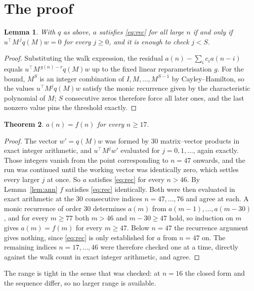 \documentclass[11pt,a4paper]{article}
\theoremstyle{plain}
\newtheorem{theorem}{Theorem}
\newtheorem{lemma}[theorem]{Lemma}
\theoremstyle{definition}
\begin{document}
\section{The proof}

\begin{lemma}\label{lem:crit}
With $q$ as above, $a$ satisfies \eqref{eq:rec} for all large $n$ if and only if
$u^{\!\top}M^{\,j}q(M)w=0$ for every $j\ge0$, and it is enough to check $j<S$.
\end{lemma}

\begin{proof}
Substituting the walk expression, the residual $a(n)-\sum_ic_ia(n-i)$ equals
$u^{\!\top}M^{\,g(n)-r}q(M)w$ up to the fixed linear reparametrisation $g$. For the bound,
$M^{S}$ is an integer combination of $I,M,\dots,M^{S-1}$ by Cayley--Hamilton, so the values
$u^{\!\top}M^{j}q(M)w$ satisfy the monic recurrence given by the characteristic polynomial of
$M$; $S$ consecutive zeros therefore force all later ones, and the last nonzero value pins the
threshold exactly.
\end{proof}

\begin{theorem}
$a(n)=f(n)$ for every $n\ge17$.
\end{theorem}

\begin{proof}
The vector $w'=q(M)w$ was formed by $30$ matrix--vector products in exact integer
arithmetic, and $u^{\!\top}M^{j}w'$ evaluated for $j=0,1,\dots$, again exactly. Those integers
vanish from the point corresponding to $n=47$ onwards, and the run was continued until the
working vector was identically zero, which settles every larger $j$ at once. So $a$ satisfies
\eqref{eq:rec} for every $n>46$. By Lemma~\ref{lem:ann} $f$ satisfies \eqref{eq:rec}
identically. Both were then evaluated in exact arithmetic at the $30$ consecutive indices
$n=47,\dots,76$ and agree at each. A monic recurrence of order $30$
determines $a(m)$ from $a(m-1),\dots,a(m-30)$, and for every $m\ge77$ both
$m>46$ and $m-30\ge47$ hold, so induction on $m$ gives $a(m)=f(m)$ for every
$m\ge47$.
Below $n=47$ the recurrence argument gives nothing, since \eqref{eq:rec} is only
established for $a$ from $n=47$ on. The remaining indices $n=17,\dots,46$ were
therefore checked one at a time, directly against the walk count in exact integer arithmetic,
and agree.
\end{proof}

The range is tight in the sense that was checked: at $n=16$ the closed form and the sequence differ, so no larger range is available.
\end{document}
